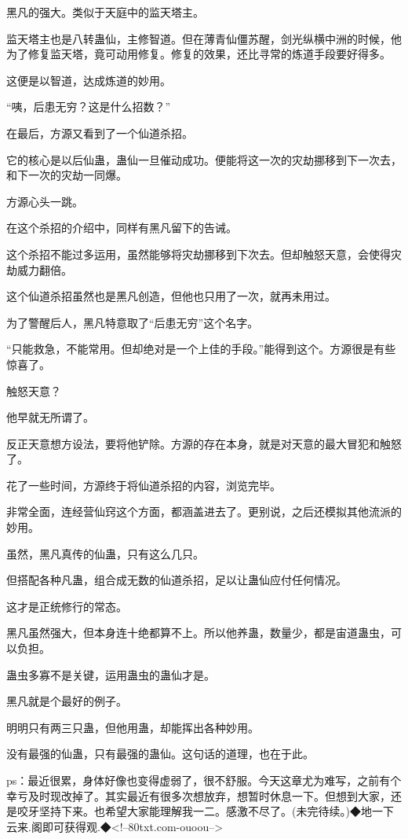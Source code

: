 \begin{this_body}
黑凡的强大。类似于天庭中的监天塔主。

监天塔主也是八转蛊仙，主修智道。但在薄青仙僵苏醒，剑光纵横中洲的时候，他为了修复监天塔，竟可动用修复。修复的效果，还比寻常的炼道手段要好得多。

这便是以智道，达成炼道的妙用。

“咦，后患无穷？这是什么招数？”

在最后，方源又看到了一个仙道杀招。

它的核心是以后仙蛊，蛊仙一旦催动成功。便能将这一次的灾劫挪移到下一次去，和下一次的灾劫一同爆。

方源心头一跳。

在这个杀招的介绍中，同样有黑凡留下的告诫。

这个杀招不能过多运用，虽然能够将灾劫挪移到下次去。但却触怒天意，会使得灾劫威力翻倍。

这个仙道杀招虽然也是黑凡创造，但他也只用了一次，就再未用过。

为了警醒后人，黑凡特意取了“后患无穷”这个名字。

“只能救急，不能常用。但却绝对是一个上佳的手段。”能得到这个。方源很是有些惊喜了。

触怒天意？

他早就无所谓了。

反正天意想方设法，要将他铲除。方源的存在本身，就是对天意的最大冒犯和触怒了。

花了一些时间，方源终于将仙道杀招的内容，浏览完毕。

非常全面，连经营仙窍这个方面，都涵盖进去了。更别说，之后还模拟其他流派的妙用。

虽然，黑凡真传的仙蛊，只有这么几只。

但搭配各种凡蛊，组合成无数的仙道杀招，足以让蛊仙应付任何情况。

这才是正统修行的常态。

黑凡虽然强大，但本身连十绝都算不上。所以他养蛊，数量少，都是宙道蛊虫，可以负担。

蛊虫多寡不是关键，运用蛊虫的蛊仙才是。

黑凡就是个最好的例子。

明明只有两三只蛊，但他用蛊，却能挥出各种妙用。

没有最强的仙蛊，只有最强的蛊仙。这句话的道理，也在于此。

ps：最近很累，身体好像也变得虚弱了，很不舒服。今天这章尤为难写，之前有个幸亏及时现改掉了。其实最近有很多次想放弃，想暂时休息一下。但想到大家，还是咬牙坚持下来。也希望大家能理解我一二。感激不尽了。(未完待续。)◆地一下云来.阁即可获得观.◆<!--80txt.com-ouoou-->

\end{this_body}

